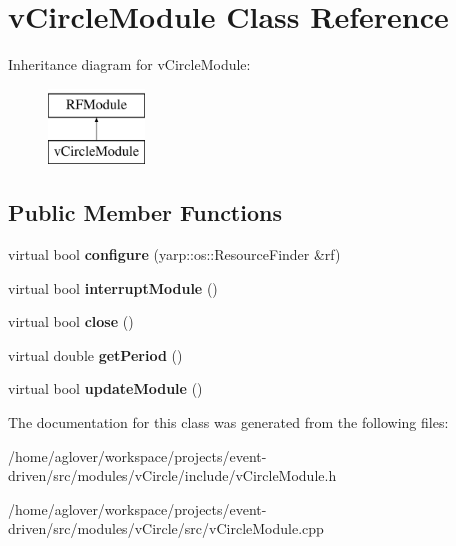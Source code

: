 \hypertarget{classvCircleModule}{}\section{v\+Circle\+Module Class Reference}
\label{classvCircleModule}
Inheritance diagram for v\+Circle\+Module\+:\begin{figure}[H]
\begin{center}
\leavevmode
\includegraphics[height=2.000000cm]{classvCircleModule}
\end{center}
\end{figure}
\subsection*{Public Member Functions}
\begin{DoxyCompactItemize}
\item 
virtual bool {\bfseries configure} (yarp\+::os\+::\+Resource\+Finder \&rf)\hypertarget{classvCircleModule_a4b1534c8acd2a20a874b1e3fb2f2bbbf}{}\label{classvCircleModule_a4b1534c8acd2a20a874b1e3fb2f2bbbf}

\item 
virtual bool {\bfseries interrupt\+Module} ()\hypertarget{classvCircleModule_aee48b945926e1ee1d53c03d2f8fdb462}{}\label{classvCircleModule_aee48b945926e1ee1d53c03d2f8fdb462}

\item 
virtual bool {\bfseries close} ()\hypertarget{classvCircleModule_a9c266baf21bf1a84e1d47bc82a6ebbaa}{}\label{classvCircleModule_a9c266baf21bf1a84e1d47bc82a6ebbaa}

\item 
virtual double {\bfseries get\+Period} ()\hypertarget{classvCircleModule_a87f95035935e336eef6b9890920c1bcb}{}\label{classvCircleModule_a87f95035935e336eef6b9890920c1bcb}

\item 
virtual bool {\bfseries update\+Module} ()\hypertarget{classvCircleModule_a0137387e1760f41bb422e10c702df2a0}{}\label{classvCircleModule_a0137387e1760f41bb422e10c702df2a0}

\end{DoxyCompactItemize}


The documentation for this class was generated from the following files\+:\begin{DoxyCompactItemize}
\item 
/home/aglover/workspace/projects/event-\/driven/src/modules/v\+Circle/include/v\+Circle\+Module.\+h\item 
/home/aglover/workspace/projects/event-\/driven/src/modules/v\+Circle/src/v\+Circle\+Module.\+cpp\end{DoxyCompactItemize}
